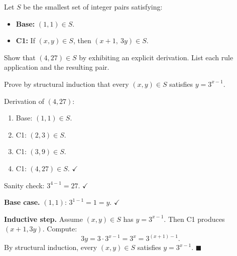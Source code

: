 \documentclass[test,letterpaper]{cs20}
\begin{document}
\begin{problem}

Let $S$ be the smallest set of integer pairs satisfying:
\begin{itemize}
\item \textbf{Base:} $(1, 1) \in S$.
\item \textbf{C1:} If $(x, y) \in S$, then $(x + 1,\ 3 y) \in S$.
\end{itemize}

\subproblem Show that $(4, 27) \in S$ by exhibiting an explicit derivation. List each rule application and the resulting pair.

\subproblem Prove by structural induction that every $(x, y) \in S$ satisfies $y = 3^{x - 1}$.

\begin{solution}
\subsolution Derivation of $(4, 27)$:
\begin{enumerate}
\item Base: $(1, 1) \in S$.
\item C1: $(2, 3) \in S$.
\item C1: $(3, 9) \in S$.
\item C1: $(4, 27) \in S$. $\checkmark$
\end{enumerate}
Sanity check: $3^{4 - 1} = 27$. $\checkmark$

\subsolution \textbf{Base case.} $(1, 1)$: $3^{1 - 1} = 1 = y$. $\checkmark$

\textbf{Inductive step.} Assume $(x, y) \in S$ has $y = 3^{x - 1}$. Then C1 produces $(x + 1, 3y)$. Compute:
\[
3 y = 3 \cdot 3^{x - 1} = 3^x = 3^{(x + 1) - 1}.
\]
By structural induction, every $(x, y) \in S$ satisfies $y = 3^{x - 1}$. $\blacksquare$
\end{solution}

\pagebreak

\end{problem}
\end{document}
